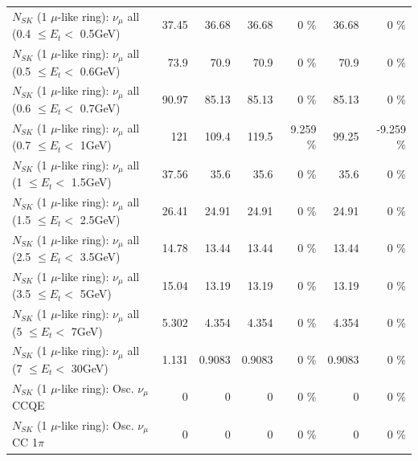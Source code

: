 \begin{table}
\begin{tabular}{| l | r | r | r  r | r  r |}
       $N_{SK}$ (1 $\mu$-like ring): $\nu_{\mu}$ all (0.4 $\leq E_{t} <$ 0.5GeV) &           37.45 &           36.68 &           36.68 &        0 \%  &           36.68 &        0 \%  \\ 
       $N_{SK}$ (1 $\mu$-like ring): $\nu_{\mu}$ all (0.5 $\leq E_{t} <$ 0.6GeV) &            73.9 &            70.9 &            70.9 &        0 \%  &            70.9 &        0 \%  \\ 
       $N_{SK}$ (1 $\mu$-like ring): $\nu_{\mu}$ all (0.6 $\leq E_{t} <$ 0.7GeV) &           90.97 &           85.13 &           85.13 &        0 \%  &           85.13 &        0 \%  \\ 
         $N_{SK}$ (1 $\mu$-like ring): $\nu_{\mu}$ all (0.7 $\leq E_{t} <$ 1GeV) &             121 &           109.4 &           119.5 &    9.259 \%  &           99.25 &   -9.259 \%  \\ 
         $N_{SK}$ (1 $\mu$-like ring): $\nu_{\mu}$ all (1 $\leq E_{t} <$ 1.5GeV) &           37.56 &            35.6 &            35.6 &        0 \%  &            35.6 &        0 \%  \\ 
       $N_{SK}$ (1 $\mu$-like ring): $\nu_{\mu}$ all (1.5 $\leq E_{t} <$ 2.5GeV) &           26.41 &           24.91 &           24.91 &        0 \%  &           24.91 &        0 \%  \\ 
       $N_{SK}$ (1 $\mu$-like ring): $\nu_{\mu}$ all (2.5 $\leq E_{t} <$ 3.5GeV) &           14.78 &           13.44 &           13.44 &        0 \%  &           13.44 &        0 \%  \\ 
         $N_{SK}$ (1 $\mu$-like ring): $\nu_{\mu}$ all (3.5 $\leq E_{t} <$ 5GeV) &           15.04 &           13.19 &           13.19 &        0 \%  &           13.19 &        0 \%  \\ 
           $N_{SK}$ (1 $\mu$-like ring): $\nu_{\mu}$ all (5 $\leq E_{t} <$ 7GeV) &           5.302 &           4.354 &           4.354 &        0 \%  &           4.354 &        0 \%  \\ 
          $N_{SK}$ (1 $\mu$-like ring): $\nu_{\mu}$ all (7 $\leq E_{t} <$ 30GeV) &           1.131 &          0.9083 &          0.9083 &        0 \%  &          0.9083 &        0 \%  \\ 
\hline
\hline
                               $N_{SK}$ (1 $\mu$-like ring): Osc. $\nu_\mu$ CCQE &               0 &               0 &               0 &        0 \%  &               0 &        0 \%  \\ 
                          $N_{SK}$ (1 $\mu$-like ring): Osc. $\nu_\mu$ CC 1$\pi$ &               0 &               0 &               0 &        0 \%  &               0 &        0 \%  \\ 

\end{tabular}
\end{table}
